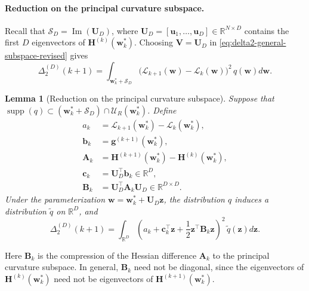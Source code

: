 \documentclass[10pt]{article}
\theoremstyle{plain}
\newtheorem{lemma}[theorem]{Lemma}
\theoremstyle{remark}
\begin{document}
\paragraph{Reduction on the principal curvature subspace.}
Recall that $\mathcal S_D=\operatorname{Im}(\mathbf U_D)$, where $\mathbf U_D=[\mathbf u_1,\dots,\mathbf u_D]\in\mathbb R^{N\times D}$ contains the first $D$ eigenvectors of $\mathbf H^{(k)}(\mathbf w_k^*)$.
Choosing $\mathbf V=\mathbf U_D$ in \eqref{eq:delta2-general-subspace-revised} gives
\begin{equation}
\label{eq:delta2-principal-subspace-revised}
\Delta_2^{(D)}(k+1)
=
\int_{\mathbf w_k^*+\mathcal S_D}
\bigl(
\mathcal L_{k+1}(\mathbf w)-\mathcal L_k(\mathbf w)
\bigr)^2
\, q(\mathbf w) d\mathbf w.
\end{equation}

\begin{lemma}[Reduction on the principal curvature subspace]
\label{lem:subspace-reduction}
Suppose that $\operatorname{supp}(q)\subset (\mathbf w_k^*+\mathcal S_D)\cap \mathcal U_R(\mathbf w_k^*)$.
Define
\begin{align*}
a_k &= \mathcal L_{k+1}(\mathbf w_k^*)-\mathcal L_k(\mathbf w_k^*), \\
\mathbf b_k &= \mathbf g^{(k+1)}(\mathbf w_k^*), \\
\mathbf A_k &= \mathbf H^{(k+1)}(\mathbf w_k^*)-\mathbf H^{(k)}(\mathbf w_k^*), \\
\mathbf c_k &= \mathbf U_D^\top \mathbf b_k \in \mathbb R^D, \\
\mathbf B_k &= \mathbf U_D^\top \mathbf A_k \mathbf U_D \in \mathbb R^{D\times D}.
\end{align*}
Under the parameterization $\mathbf w=\mathbf w_k^*+\mathbf U_D\mathbf z$, the distribution $q$ induces a distribution $\tilde q$ on $\mathbb R^D$, and
\begin{equation}
\label{eq:subspace-reduction-integral}
\Delta_2^{(D)}(k+1)
=
\int_{\mathbb R^D}
\left(
a_k + \mathbf c_k^\top \mathbf z + \frac12 \mathbf z^\top \mathbf B_k \mathbf z
\right)^2
\, \tilde q(\mathbf z) d\mathbf z.
\end{equation}
\end{lemma}

Here $\mathbf B_k$ is the compression of the Hessian difference $\mathbf A_k$ to the principal curvature subspace.
In general, $\mathbf B_k$ need not be diagonal, since the eigenvectors of $\mathbf H^{(k)}(\mathbf w_k^*)$ need not be eigenvectors of $\mathbf H^{(k+1)}(\mathbf w_k^*)$.
\end{document}
